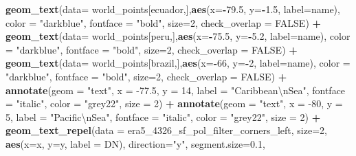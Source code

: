 \documentclass[12pt,twoside]{reedthesis}
\newenvironment{Shaded}{\begin{snugshade}}{\end{snugshade}}
\newcommand{\CharTok}[1]{\textcolor[rgb]{0.31,0.60,0.02}{#1}}
\newcommand{\DataTypeTok}[1]{\textcolor[rgb]{0.13,0.29,0.53}{#1}}
\newcommand{\DecValTok}[1]{\textcolor[rgb]{0.00,0.00,0.81}{#1}}
\newcommand{\FloatTok}[1]{\textcolor[rgb]{0.00,0.00,0.81}{#1}}
\newcommand{\KeywordTok}[1]{\textcolor[rgb]{0.13,0.29,0.53}{\textbf{#1}}}
\newcommand{\NormalTok}[1]{#1}
\newcommand{\OperatorTok}[1]{\textcolor[rgb]{0.81,0.36,0.00}{\textbf{#1}}}
\newcommand{\OtherTok}[1]{\textcolor[rgb]{0.56,0.35,0.01}{#1}}
\newcommand{\StringTok}[1]{\textcolor[rgb]{0.31,0.60,0.02}{#1}}
\begin{document}
\begin{Shaded}
\begin{Highlighting}[]
\StringTok{  }\KeywordTok{geom_text}\NormalTok{(}\DataTypeTok{data=}\NormalTok{ world_points[ecuador,],}\KeywordTok{aes}\NormalTok{(}\DataTypeTok{x=}\OperatorTok{-}\FloatTok{79.5}\NormalTok{, }\DataTypeTok{y=}\OperatorTok{-}\FloatTok{1.5}\NormalTok{, }\DataTypeTok{label=}\NormalTok{name), }\DataTypeTok{color =} \StringTok{"darkblue"}\NormalTok{, }\DataTypeTok{fontface =} \StringTok{"bold"}\NormalTok{, }\DataTypeTok{size=}\DecValTok{2}\NormalTok{, }\DataTypeTok{check_overlap =} \OtherTok{FALSE}\NormalTok{) }\OperatorTok{+}
\StringTok{  }\KeywordTok{geom_text}\NormalTok{(}\DataTypeTok{data=}\NormalTok{ world_points[peru,],}\KeywordTok{aes}\NormalTok{(}\DataTypeTok{x=}\OperatorTok{-}\FloatTok{75.5}\NormalTok{, }\DataTypeTok{y=}\OperatorTok{-}\FloatTok{5.2}\NormalTok{, }\DataTypeTok{label=}\NormalTok{name), }\DataTypeTok{color =} \StringTok{"darkblue"}\NormalTok{, }\DataTypeTok{fontface =} \StringTok{"bold"}\NormalTok{, }\DataTypeTok{size=}\DecValTok{2}\NormalTok{, }\DataTypeTok{check_overlap =} \OtherTok{FALSE}\NormalTok{) }\OperatorTok{+}
\StringTok{  }\KeywordTok{geom_text}\NormalTok{(}\DataTypeTok{data=}\NormalTok{ world_points[brazil,],}\KeywordTok{aes}\NormalTok{(}\DataTypeTok{x=}\OperatorTok{-}\DecValTok{66}\NormalTok{, }\DataTypeTok{y=}\OperatorTok{-}\DecValTok{2}\NormalTok{, }\DataTypeTok{label=}\NormalTok{name), }\DataTypeTok{color =} \StringTok{"darkblue"}\NormalTok{, }\DataTypeTok{fontface =} \StringTok{"bold"}\NormalTok{, }\DataTypeTok{size=}\DecValTok{2}\NormalTok{, }\DataTypeTok{check_overlap =} \OtherTok{FALSE}\NormalTok{) }\OperatorTok{+}
\StringTok{  }\KeywordTok{annotate}\NormalTok{(}\DataTypeTok{geom =} \StringTok{"text"}\NormalTok{, }\DataTypeTok{x =} \FloatTok{-77.5}\NormalTok{, }\DataTypeTok{y =} \DecValTok{14}\NormalTok{, }\DataTypeTok{label =} \StringTok{"Caribbean}\CharTok{\textbackslash{}n}\StringTok{Sea"}\NormalTok{, }\DataTypeTok{fontface =} \StringTok{"italic"}\NormalTok{, }\DataTypeTok{color =} \StringTok{"grey22"}\NormalTok{, }\DataTypeTok{size =} \DecValTok{2}\NormalTok{) }\OperatorTok{+}\StringTok{ }
\StringTok{  }\KeywordTok{annotate}\NormalTok{(}\DataTypeTok{geom =} \StringTok{"text"}\NormalTok{, }\DataTypeTok{x =} \DecValTok{-80}\NormalTok{, }\DataTypeTok{y =} \DecValTok{5}\NormalTok{, }\DataTypeTok{label =} \StringTok{"Pacific}\CharTok{\textbackslash{}n}\StringTok{Sea"}\NormalTok{, }\DataTypeTok{fontface =} \StringTok{"italic"}\NormalTok{, }\DataTypeTok{color =} \StringTok{"grey22"}\NormalTok{, }\DataTypeTok{size =} \DecValTok{2}\NormalTok{) }\OperatorTok{+}
\StringTok{  }\KeywordTok{geom_text_repel}\NormalTok{(}\DataTypeTok{data =}\NormalTok{ era5_}\DecValTok{4326}\NormalTok{_sf_pol_filter_corners_left, }\DataTypeTok{size=}\DecValTok{2}\NormalTok{, }\KeywordTok{aes}\NormalTok{(}\DataTypeTok{x=}\NormalTok{x, }\DataTypeTok{y=}\NormalTok{y, }\DataTypeTok{label =}\NormalTok{ DN), }\DataTypeTok{direction=}\StringTok{"y"}\NormalTok{, }\DataTypeTok{segment.size=}\FloatTok{0.1}\NormalTok{, }

\end{Highlighting}
\end{Shaded}
\end{document}
